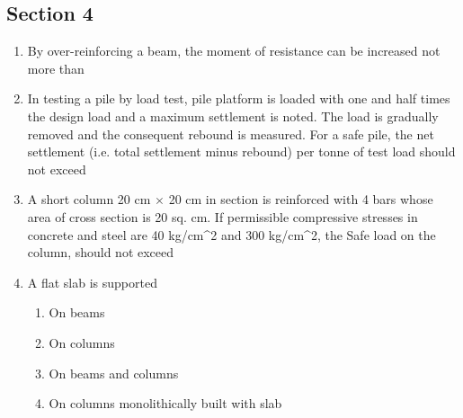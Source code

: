 \documentclass[11pt,a4paper]{article}
\begin{document}
\subsection*{Section 4}
\begin{enumerate}
\item{By over-reinforcing a beam, the moment of resistance can be increased not more than}
\\
\item{In testing a pile by load test, pile platform is loaded with one and half times the design load and a maximum settlement is noted. The load is gradually removed and the consequent rebound is measured. For a safe pile, the net settlement (i.e. total settlement minus rebound) per tonne of test load should not exceed}
\\\begin{enumerate*}[itemjoin=\qquad, label=\Alph*.]
\item{10 mm}
\item{15 mm}
\item{20 mm}
\item{25 mm}
\end{enumerate*}
\item{A short column 20 cm $\times$ 20 cm in section is reinforced with 4 bars whose area of cross section is 20 sq. cm. If permissible compressive stresses in concrete and steel are 40 kg/cm\^{}2 and 300 kg/cm\^{}2, the Safe load on the column, should not exceed
}
\\
\item{A flat slab is supported}
\begin{enumerate}[label=\Alph*.]
\item{On beams}
\item{On columns}
\item{On beams and columns}
\item{On columns monolithically built with slab}

\end{enumerate}
\end{enumerate}
\end{document}
